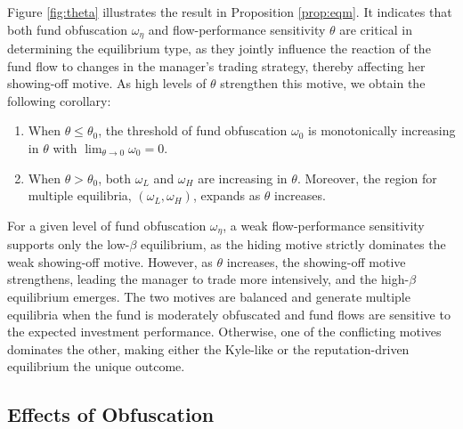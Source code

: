 Figure \ref{fig:theta} illustrates the result in Proposition \ref{prop:eqm}. It indicates that both fund obfuscation $\omega_{\eta}$ and flow-performance sensitivity $\theta$  are critical in determining the equilibrium type, as they jointly influence the reaction of the fund flow to changes in the manager's trading strategy, thereby affecting her showing-off motive. As high levels of $\theta$ strengthen this motive, we obtain the following corollary:
\begin{corollary}\label{cor:theta_omega}
    \begin{enumerate}[label=(\roman*)]
        \item When $\theta\le\theta_{0}$, the threshold of fund obfuscation $\omega_{0}$ is monotonically increasing in $\theta$ with $\lim_{\theta\rightarrow 0}\omega_{0} = 0$.
        \item When $\theta>\theta_{0}$, both $\omega_L$ and $\omega_H$ are increasing in $\theta$. Moreover, the region for multiple equilibria, $(\omega_L, \omega_H)$, expands as $\theta$ increases. 
    \end{enumerate}
\end{corollary}

For a given level of fund obfuscation $\omega_{\eta}$, a weak flow-performance sensitivity supports only the low-$\beta$ equilibrium, as the hiding motive strictly dominates the weak showing-off motive. However, as $\theta$ increases, the showing-off motive strengthens, leading the manager to trade more intensively, and the high-$\beta$ equilibrium emerges. The two motives are balanced and generate multiple equilibria when the fund is moderately obfuscated and fund flows are sensitive to the expected investment performance. Otherwise, one of the conflicting motives dominates the other, making either the Kyle-like or the reputation-driven equilibrium the unique outcome.



\subsection{Effects of Obfuscation}\label{ss:effects_of_opacity}

